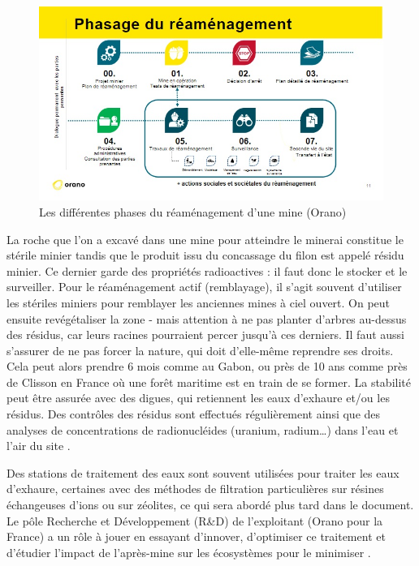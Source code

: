 \documentclass{article}
\begin{document}
\begin{figure}[!h]
    \centering
    \includegraphics[width=\linewidth]{I_B_1.jpg}
    \caption{Les différentes phases du réaménagement d'une mine (Orano)}
    \label{fig:phases_reamenagement}
\end{figure}

La roche que l’on a excavé dans une mine pour atteindre le minerai constitue le stérile minier tandis que le produit issu du concassage du filon est appelé résidu minier. Ce dernier garde des propriétés radioactives : il faut donc le stocker et le surveiller.
Pour le réaménagement actif (remblayage), il s’agit souvent d’utiliser les stériles miniers pour remblayer les anciennes mines à ciel ouvert. On peut ensuite revégétaliser la zone - mais attention à ne pas planter d’arbres au-dessus des résidus, car leurs racines pourraient percer jusqu’à ces derniers. Il faut aussi s’assurer de ne pas forcer la nature, qui doit d’elle-même reprendre ses droits. Cela peut alors prendre 6 mois comme au Gabon, ou près de 10 ans comme près de Clisson en France où une forêt maritime est en train de se former. La stabilité peut être assurée avec des digues, qui retiennent les eaux d’exhaure et/ou les résidus. Des contrôles des résidus sont effectués régulièrement ainsi que des analyses de concentrations de radionucléides (uranium, radium…) dans l’eau et l’air du site \cite{himeur_apres-mine_2020}.

Des stations de traitement des eaux sont souvent utilisées pour traiter les eaux d’exhaure, certaines avec des méthodes de filtration particulières sur résines échangeuses d’ions ou sur zéolites, ce qui sera abordé plus tard dans le document. Le pôle Recherche et Développement (R\&D) de l’exploitant (Orano pour la France) a un rôle à jouer en essayant d’innover, d’optimiser ce traitement et d’étudier l’impact de l’après-mine sur les écosystèmes pour le minimiser \cite{schick_les_2020}.
\end{document}
